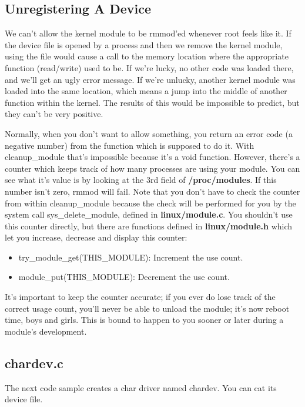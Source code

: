 \documentclass[11pt]{article}
\begin{document}
\subsection*{Unregistering A Device}
\label{sec:orgc69529a}
We can't allow the kernel module to be rmmod'ed whenever root feels like it. If the device file is opened by a process and then we remove the kernel module, using the file would cause a call to the memory location where the appropriate function (read/write) used to be. If we're lucky, no other code was loaded there, and we'll get an ugly error message. If we're unlucky, another kernel module was loaded into the same location, which means a jump into the middle of another function within the kernel. The results of this would be impossible to predict, but they can't be very positive.

Normally, when you don't want to allow something, you return an error code (a negative number) from the function which is supposed to do it. With cleanup\_module that's impossible because it's a void function. However, there's a counter which keeps track of how many processes are using your module. You can see what it's value is by looking at the 3rd field of \textbf{/proc/modules}. If this number isn't zero, rmmod will fail. Note that you don't have to check the counter from within cleanup\_module because the check will be performed for you by the system call sys\_delete\_module, defined in \textbf{linux/module.c}. You shouldn't use this counter directly, but there are functions defined in \textbf{linux/module.h} which let you increase, decrease and display this counter:

\begin{itemize}
\item try\_module\_get(THIS\_MODULE): Increment the use count.
\item module\_put(THIS\_MODULE): Decrement the use count.
\end{itemize}

It's important to keep the counter accurate; if you ever do lose track of the correct usage count, you'll never be able to unload the module; it's now reboot time, boys and girls. This is bound to happen to you sooner or later during a module's development.

\subsection*{chardev.c}
\label{sec:org074e4bf}
The next code sample creates a char driver named chardev. You can cat its device file.
\end{document}
